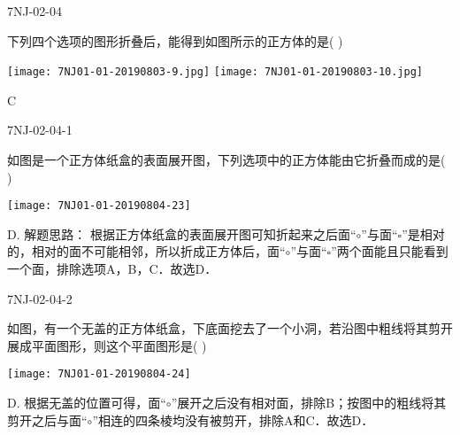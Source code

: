 \begin{defproblem}{7NJ-02-04}%
\begin{onlyproblem}%
下列四个选项的图形折叠后，能得到如图所示的正方体的是(    ) 
\begin{center}
\texttt{[image: 7NJ01-01-20190803-9.jpg]}
\texttt{[image: 7NJ01-01-20190803-10.jpg]}
\end{center}


\end{onlyproblem}%
\begin{onlysolution}%
\begin{solution}%
C
\end{solution}%
\end{onlysolution}%
\end{defproblem}



\begin{defproblem}{7NJ-02-04-1}%
\begin{onlyproblem}%
如图是一个正方体纸盒的表面展开图，下列选项中的正方体能由它折叠而成的是(    ) 
\begin{center}
\texttt{[image: 7NJ01-01-20190804-23]}
\end{center}


\end{onlyproblem}%
\begin{onlysolution}%
\begin{solution}%
D. 
解题思路： 根据正方体纸盒的表面展开图可知折起来之后面“$\circ$”与面“$\square$”是相对的，相对的面不可能相邻，所以折成正方体后，面“$\circ$”与面“$\square$”两个面能且只能看到一个面，排除选项A，B，C．故选D． 

\end{solution}%
\end{onlysolution}%
\end{defproblem}




\begin{defproblem}{7NJ-02-04-2}%
\begin{onlyproblem}%
如图，有一个无盖的正方体纸盒，下底面挖去了一个小洞，若沿图中粗线将其剪开展成平面图形，则这个平面图形是(    ) 
\begin{center}
\texttt{[image: 7NJ01-01-20190804-24]}
\end{center}


\end{onlyproblem}%
\begin{onlysolution}%
\begin{solution}%
D. 根据无盖的位置可得，面“$\circ$”展开之后没有相对面，排除B；按图中的粗线将其剪开之后与面“$\circ$”相连的四条棱均没有被剪开，排除A和C．故选D． 
\end{solution}%
\end{onlysolution}%
\end{defproblem}


